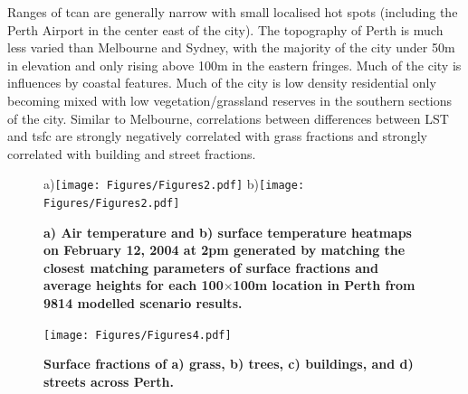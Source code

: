 \documentclass[final,3p,times,authoryear]{elsarticle}
\begin{document}
Ranges of \gls{tcan} are generally narrow with small localised hot spots (including the Perth Airport in the center east of the city). The topography of Perth is much less varied than Melbourne and Sydney, with the majority of the city under 50m in elevation and only rising above 100m in the eastern fringes. Much of the city is influences by coastal features. Much of the city is low density residential only becoming mixed with low vegetation/grassland reserves in the southern sections of the city. Similar to Melbourne, correlations between differences between LST and \gls{tsfc} are strongly negatively correlated with grass fractions and strongly correlated with building and street fractions.



\begin{figure}
\centering
a)\texttt{[image: Figures/Figures2.pdf]}
b)\texttt{[image: Figures/Figures2.pdf]}
\caption{\bf a) Air temperature and b) surface temperature heatmaps on February 12, 2004 at 2pm generated by matching the closest matching parameters of surface fractions and average heights for each 100$\times$100m location in Perth from 9814 modelled scenario results.  }
 \label{fig:TaPerth}\label{fig:TsfcPerth}
\end{figure}

\begin{figure}
\centering
\texttt{[image: Figures/Figures4.pdf]}
\caption{\bf Surface fractions of a) grass, b) trees, c) buildings, and d) streets across Perth.}
 \label{fig:pertfracs}
\end{figure}
\end{document}
